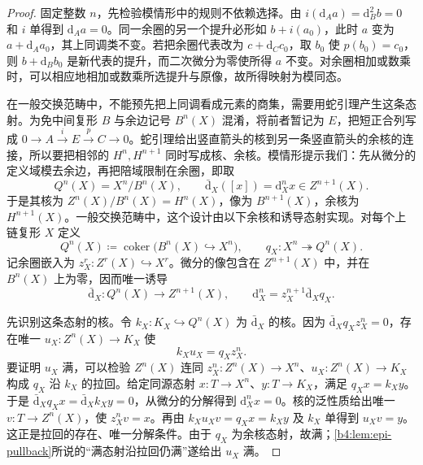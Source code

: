 \begin{proof}
	固定整数 \(n\)，先检验模情形中的规则不依赖选择。由 \(i(\mathrm{d}_Aa)=\mathrm{d}_B^2b=0\) 和 \(i\) 单得到 \(\mathrm{d}_Aa=0\)。同一余圈的另一个提升必形如 \(b+i(a_0)\)，此时 \(a\) 变为 \(a+\mathrm{d}_Aa_0\)，其上同调类不变。若把余圈代表改为 \(c+\mathrm{d}_Cc_0\)，取 \(b_0\) 使 \(p(b_0)=c_0\)，则 \(b+\mathrm{d}_Bb_0\) 是新代表的提升，而二次微分为零使所得 \(a\) 不变。对余圈相加或数乘时，可以相应地相加或数乘所选提升与原像，故所得映射为模同态。

	在一般交换范畴中，不能预先把上同调看成元素的商集，需要用蛇引理产生这条态射。为免中间复形 \(B\) 与余边记号 \(B^n(X)\) 混淆，将前者暂记为 \(E\)，把短正合列写成 \(0\to A\xrightarrow{i}E\xrightarrow{p}C\to0\)。蛇引理给出竖直箭头的核到另一条竖直箭头的余核的连接，所以要把相邻的 \(H^n,H^{n+1}\) 同时写成核、余核。模情形提示我们：先从微分的定义域模去余边，再把陪域限制在余圈，即取
	\[
		Q^n(X)=X^n/B^n(X),\qquad \bar{\mathrm{d}}_X([x])=\mathrm{d}_X^nx\in Z^{n+1}(X).
	\]
	于是其核为 \(Z^n(X)/B^n(X)=H^n(X)\)，像为 \(B^{n+1}(X)\)，余核为 \(H^{n+1}(X)\)。一般交换范畴中，这个设计由以下余核和诱导态射实现。对每个上链复形 \(X\) 定义
	\[
		Q^n(X)\coloneqq\operatorname{coker}\bigl(B^n(X)\hookrightarrow X^n\bigr), \qquad q_X:X^n\twoheadrightarrow Q^n(X).
	\]
	记余圈嵌入为 \(z_X^r:Z^r(X)\hookrightarrow X^r\)。微分的像包含在 \(Z^{n+1}(X)\) 中，并在 \(B^n(X)\) 上为零，因而唯一诱导
	\[
		\bar{\mathrm{d}}_X:Q^n(X)\longrightarrow Z^{n+1}(X), \qquad \mathrm{d}_X^n=z_X^{n+1}\bar{\mathrm{d}}_Xq_X.
	\]

	先识别这条态射的核。令 \(k_X:K_X\hookrightarrow Q^n(X)\) 为 \(\bar{\mathrm{d}}_X\) 的核。因为 \(\bar{\mathrm{d}}_Xq_Xz_X^n=0\)，存在唯一 \(u_X:Z^n(X)\to K_X\) 使
	\[
		k_Xu_X=q_Xz_X^n.
	\]
	要证明 \(u_X\) 满，可以检验 \(Z^n(X)\) 连同 \(z_X^n:Z^n(X)\to X^n\)、\(u_X:Z^n(X)\to K_X\) 构成 \(q_X\) 沿 \(k_X\) 的拉回。给定同源态射 \(x:T\to X^n\)、\(y:T\to K_X\)，满足 \(q_Xx=k_Xy\)。于是 \(\bar{\mathrm{d}}_Xq_Xx=\bar{\mathrm{d}}_Xk_Xy=0\)，从微分的分解得到 \(\mathrm{d}_X^nx=0\)。核的泛性质给出唯一 \(v:T\to Z^n(X)\)，使 \(z_X^nv=x\)。再由 \(k_Xu_Xv=q_Xx=k_Xy\) 及 \(k_X\) 单得到 \(u_Xv=y\)。这正是拉回的存在、唯一分解条件。由于 \(q_X\) 为余核态射，故满；\cref{b4:lem:epi-pullback}所说的“满态射沿拉回仍满”遂给出 \(u_X\) 满。


\end{proof}
